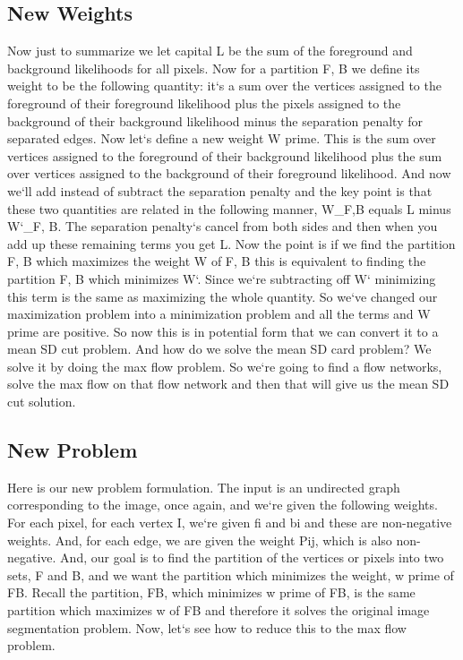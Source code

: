 \subsection{New Weights}
Now just to summarize we let capital L be the sum of the foreground and background likelihoods for all pixels.
Now for a partition F, B we define its weight to be the following quantity: it`s a sum over the vertices assigned to the foreground of their foreground likelihood plus the pixels assigned to the background of their background likelihood minus the separation penalty for separated edges.
Now let`s define a new weight W prime.
This is the sum over vertices assigned to the foreground of their background likelihood plus the sum over vertices assigned to the background of their foreground likelihood.
And now we`ll add instead of subtract the separation penalty and the key point is that these two quantities are related in the following manner, W\_F,B equals L minus W`\_F, B\@.
The separation penalty`s cancel from both sides and then when you add up these remaining terms you get L\@.
Now the point is if we find the partition F, B which maximizes the weight W of F, B this is equivalent to finding the partition F, B which minimizes W`.
Since we`re subtracting off W` minimizing this term is the same as maximizing the whole quantity.
So we`ve changed our maximization problem into a minimization problem and all the terms and W prime are positive.
So now this is in potential form that we can convert it to a mean SD cut problem.
And how do we solve the mean SD card problem? We solve it by doing the max flow problem.
So we`re going to find a flow networks, solve the max flow on that flow network and then that will give us the mean SD cut solution.

\subsection{New Problem}
Here is our new problem formulation.
The input is an undirected graph corresponding to the image, once again, and we`re given the following weights.
For each pixel, for each vertex I, we`re given fi and bi and these are non-negative weights.
And, for each edge, we are given the weight Pij, which is also non-negative.
And, our goal is to find the partition of the vertices or pixels into two sets, F and B, and we want the partition which minimizes the weight, w prime of FB\@.
Recall the partition, FB, which minimizes w prime of FB, is the same partition which maximizes w of FB and therefore it solves the original image segmentation problem.
Now, let`s see how to reduce this to the max flow problem.

